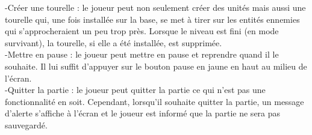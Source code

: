 \documentclass[a4paper,11pt]{article}
\begin{document}
-Créer une tourelle : le joueur peut non seulement créer des unités mais aussi une tourelle qui, une fois installée sur la base,
se met à tirer sur les entités ennemies qui s'approcheraient un peu trop près. Lorsque le niveau est fini (en mode survivant),
la tourelle, si elle a été installée, est supprimée.\\ 

-Mettre en pause : le joueur peut mettre en pause et reprendre quand il le souhaite. Il lui suffit d'appuyer sur le bouton pause en jaune en haut au milieu de l'écran.\\

-Quitter la partie : le joueur peut quitter la partie ce qui n'est pas une fonctionnalité en soit. Cependant, lorsqu'il souhaite
quitter la partie, un message d'alerte s'affiche à l'écran et le joueur est informé que la partie ne sera pas sauvegardé.\\
\end{document}
